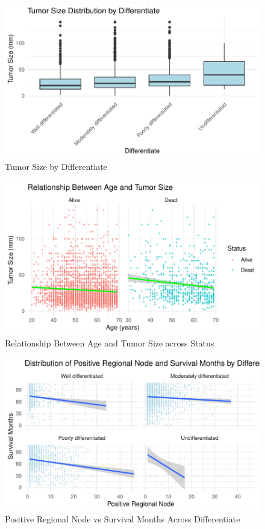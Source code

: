 \documentclass[
]{article}
\begin{document}
\begin{figure}
\includegraphics[width=0.9\linewidth]{P8130_project_report_files/figure-latex/tumor_size_by_differentiate-1} \caption{Tumor Size by Differentiate}\label{fig:tumor_size_by_differentiate}
\end{figure}

\begin{figure}
\includegraphics[width=0.9\linewidth]{P8130_project_report_files/figure-latex/relationship_between_age_and_tumor_size_across_status-1} \caption{Relationship Between Age and Tumor Size across Status}\label{fig:relationship_between_age_and_tumor_size_across_status}
\end{figure}

\begin{figure}
\includegraphics[width=0.9\linewidth]{P8130_project_report_files/figure-latex/positive_regional_node_vs_survival_months_across_differentiate-1} \caption{Positive Regional Node vs Survival Months Across Differentiate}\label{fig:positive_regional_node_vs_survival_months_across_differentiate}
\end{figure}
\end{document}
